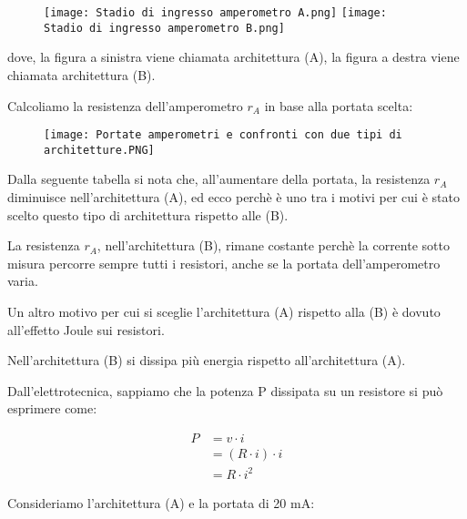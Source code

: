 \begin{figure}[h]
    \centering
    \texttt{[image: Stadio di ingresso amperometro A.png]}
    \texttt{[image: Stadio di ingresso amperometro B.png]}
\end{figure}

dove, la figura a sinistra viene chiamata architettura (A), la figura a destra viene chiamata architettura (B). \newline 

\newpage 

Calcoliamo la resistenza dell'amperometro $r_A$ in base alla portata scelta: 

\begin{figure}[h]
    \centering
    \texttt{[image: Portate amperometri e confronti con due tipi di architetture.PNG]}
\end{figure}

Dalla seguente tabella si nota che, all'aumentare della portata, la resistenza $r_A$ diminuisce nell'architettura (A), 
ed ecco perchè è uno tra i motivi per cui è stato scelto questo tipo di architettura rispetto alle (B). \newline 

La resistenza $r_A$, nell'architettura (B), rimane costante perchè la corrente sotto misura percorre sempre tutti i resistori, anche se la portata dell'amperometro varia. \newline 

Un altro motivo per cui si sceglie l'architettura (A) rispetto alla (B) è dovuto all'effetto Joule sui resistori. \newline 

Nell'architettura (B) si dissipa più energia rispetto all'architettura (A). \newline 

Dall'elettrotecnica, sappiamo che la potenza P dissipata su un resistore si può esprimere come:

{
    \Large 
    \begin{equation}
        \begin{split}
            P &= v \cdot i 
            \\ 
            &= (R \cdot i) \cdot i 
            \\
            &= R \cdot i^{2}   
        \end{split}
    \end{equation}
}

Consideriamo l'architettura (A) e la portata di 20 mA:

